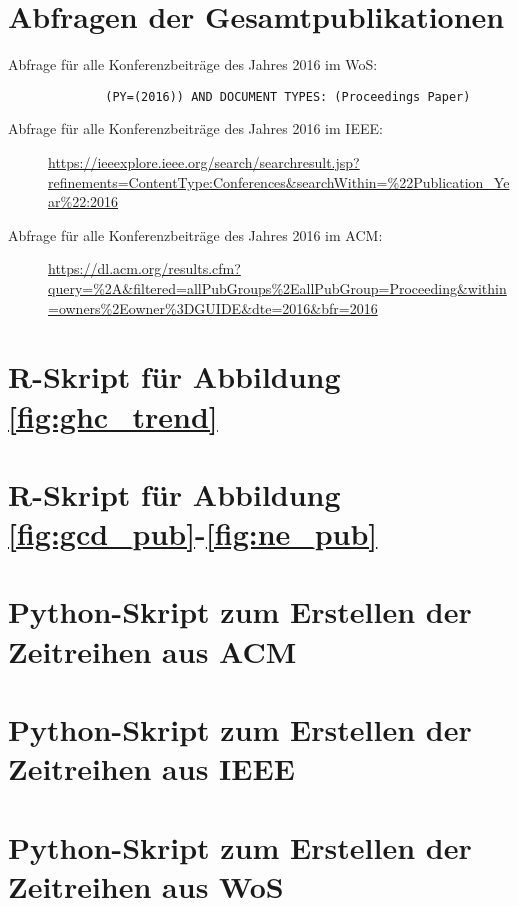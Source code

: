 \renewcommand{\appendixname}{Anhang}
\renewcommand{\appendixtocname}{Anhang}
\renewcommand{\appendixpagename}{Anhang}

\begin{appendices}
	\section{Abfragen der Gesamtpublikationen}\label{sec:query_all}
	\begin{description}
		\item[Abfrage für alle Konferenzbeiträge des Jahres 2016 im \ac{WoS}:]
		\hfill \vspace{-3ex}
		\begin{verbatim}
		(PY=(2016)) AND DOCUMENT TYPES: (Proceedings Paper)
		\end{verbatim}

		\item[Abfrage für alle Konferenzbeiträge des Jahres 2016 im \ac{IEEE}:]\hfill
		\url{https://ieeexplore.ieee.org/search/searchresult.jsp?refinements=ContentType:Conferences&searchWithin=%22Publication_Year%22:2016}

			\item[Abfrage für alle Konferenzbeiträge des Jahres 2016 im \ac{ACM}:]\hfill
			\url{https://dl.acm.org/results.cfm?query=%2A&filtered=allPubGroups%2EallPubGroup=Proceeding&within=owners%2Eowner%3DGUIDE&dte=2016&bfr=2016}
			\end{description}
	\clearpage
	\section{R-Skript für Abbildung \ref{fig:ghc_trend}}\label{sec:ghc_trend_plot}
	
	\clearpage
	\section{R-Skript für Abbildung \ref{fig:gcd_pub}-\ref{fig:ne_pub}}\label{sec:pub_plot}
	
	\clearpage
	\section{Python-Skript zum Erstellen der Zeitreihen aus \ac{ACM}}\label{sec:python_ts_acm}
	
	\clearpage
	\section{Python-Skript zum Erstellen der Zeitreihen aus \ac{IEEE}}\label{sec:python_ts_ieee}
	
	\clearpage
	\section{Python-Skript zum Erstellen der Zeitreihen aus \ac{WoS}}\label{sec:python_ts_wos}
	
\end{appendices}